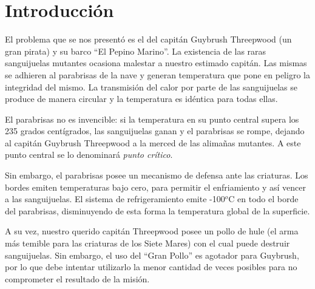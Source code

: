 
\lstset{escapechar=@,style=customc}




\fecha{\today}




\maketitle

\tableofcontents
\newpage

\section*{Introducción}

El problema que se nos presentó es el del capitán Guybrush Threepwood (un gran pirata) y su barco ``El Pepino Marino''. La existencia de las raras sanguijuelas mutantes ocasiona malestar a nuestro estimado capitán. Las mismas se adhieren al parabrisas de la nave y generan temperatura que pone en peligro la integridad del mismo. La transmisión del calor por parte de las sanguijuelas se produce de manera circular y la temperatura es idéntica para todas ellas. 
\par 
El parabrisas no es invencible: si la temperatura en su punto central supera los 235 grados centígrados, las sanguijuelas ganan y el parabrisas se rompe, dejando al capitán Guybrush Threepwood a la merced de las alimañas mutantes. A este punto central se lo denominará \textit{punto crítico}.
\par 
Sin embargo, el parabrisas posee un mecanismo de defensa ante las criaturas. Los bordes emiten temperaturas bajo cero, para permitir el enfriamiento y así vencer a las sanguijuelas. El sistema de refrigeramiento emite -100$^{o}$C en todo el borde del parabrisas, disminuyendo de esta forma la temperatura global de la superficie. 
\par 
A su vez, nuestro querido capitán Threepwood posee un pollo de hule (el arma más temible para las criaturas de los Siete Mares) con el cual puede destruir sanguijuelas. Sin embargo, el uso del ``Gran Pollo'' es agotador para Guybrush, por lo que debe intentar utilizarlo la menor cantidad de veces posibles para no comprometer el resultado de la misión. 

